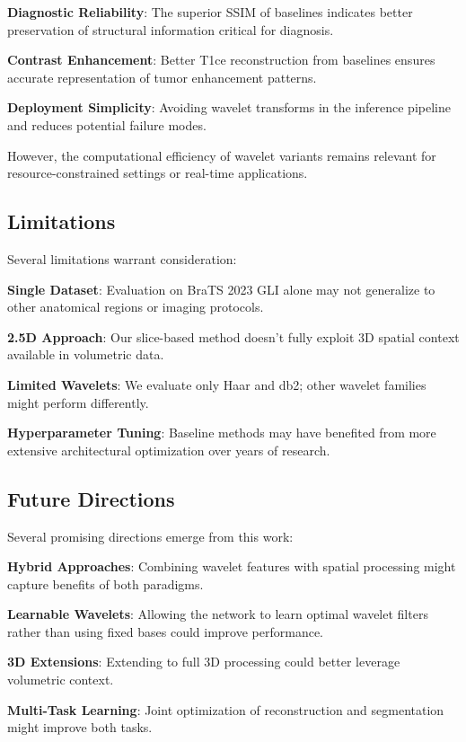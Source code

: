 \documentclass[conference]{IEEEtran}
\begin{document}
\textbf{Diagnostic Reliability}: The superior SSIM of baselines indicates better preservation of structural information critical for diagnosis.

\textbf{Contrast Enhancement}: Better T1ce reconstruction from baselines ensures accurate representation of tumor enhancement patterns.

\textbf{Deployment Simplicity}: Avoiding wavelet transforms in the inference pipeline and reduces potential failure modes.

However, the computational efficiency of wavelet variants remains relevant for resource-constrained settings or real-time applications.

\subsection{Limitations}

Several limitations warrant consideration:

\textbf{Single Dataset}: Evaluation on BraTS 2023 GLI alone may not generalize to other anatomical regions or imaging protocols.

\textbf{2.5D Approach}: Our slice-based method doesn't fully exploit 3D spatial context available in volumetric data.

\textbf{Limited Wavelets}: We evaluate only Haar and db2; other wavelet families might perform differently.

\textbf{Hyperparameter Tuning}: Baseline methods may have benefited from more extensive architectural optimization over years of research.

\subsection{Future Directions}

Several promising directions emerge from this work:

\textbf{Hybrid Approaches}: Combining wavelet features with spatial processing might capture benefits of both paradigms.

\textbf{Learnable Wavelets}: Allowing the network to learn optimal wavelet filters rather than using fixed bases could improve performance.

\textbf{3D Extensions}: Extending to full 3D processing could better leverage volumetric context.

\textbf{Multi-Task Learning}: Joint optimization of reconstruction and segmentation might improve both tasks.
\end{document}
